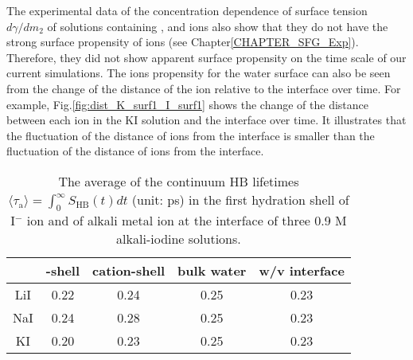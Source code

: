 The experimental data of the concentration dependence of surface tension $d\gamma/dm_2$ of solutions 
containing \Li, \Na and \K ions also show that they do not have the strong surface propensity of \I ions (see Chapter\thinspace\ref{CHAPTER_SFG_Exp}).
Therefore, they did not show apparent surface propensity on the time scale of our current simulations.
The ions propensity for the water surface can also be seen from the change of the distance of the ion relative to the interface over time. 
For example, Fig.\thinspace\ref{fig:dist_K_surf1_I_surf1} shows the change of the distance between each ion in the KI solution 
and the interface over time. It illustrates that the fluctuation of the distance of \I ions from the interface 
is smaller than the fluctuation of the distance of \K ions from the interface.

%
\begin{table}[H]
\centering
\caption{\label{tab:tau_hb_alkali_iodine} 
The average of the continuum HB lifetimes $\langle\tau_{\text{a}}\rangle=\int_0^\infty S_\text{HB}(t) dt$ (unit: ps) in the first hydration shell of I$^-$ ion 
and of alkali metal ion at the interface of three 0.9 M alkali-iodine solutions.
}
\begin{tabular}{ccccc}
  &\I-shell &cation-shell & bulk water & w/v interface \\
\hline
 LiI & 0.22 & 0.24 & 0.25 & 0.23\\
 NaI & 0.24 & 0.28 & 0.25 & 0.23\\
 KI  & 0.20 & 0.23 & 0.25 &0.23\\
\end{tabular}
\end{table} 

